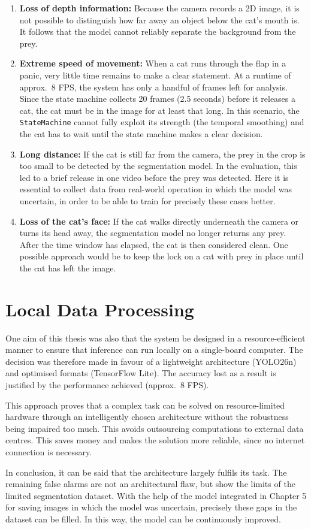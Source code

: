 \begin{enumerate}
    \item \textbf{Loss of depth information:} Because the camera records a 2D image, it is not possible to distinguish how far away an object below the cat's mouth is. It follows that the model cannot reliably separate the background from the prey.
    \item \textbf{Extreme speed of movement:} When a cat runs through the flap in a panic, very little time remains to make a clear statement. At a runtime of approx.\ 8 FPS, the system has only a handful of frames left for analysis. Since the state machine collects 20 frames (2.5 seconds) before it releases a cat, the cat must be in the image for at least that long.  In this scenario, the \texttt{StateMachine} cannot fully exploit its strength (the temporal smoothing) and the cat has to wait until the state machine makes a clear decision.
    \item \textbf{Long distance:} If the cat is still far from the camera, the prey in the crop is too small to be detected by the segmentation model. In the evaluation, this led to a brief release in one video before the prey was detected. Here it is essential to collect data from real-world operation in which the model was uncertain, in order to be able to train for precisely these cases better.
    \item \textbf{Loss of the cat's face:} If the cat walks directly underneath the camera or turns its head away, the segmentation model no longer returns any prey. After the time window has elapsed, the cat is then considered clean. One possible approach would be to keep the lock on a cat with prey in place until the cat has left the image.
\end{enumerate}

\section{Local Data Processing}
One aim of this thesis was also that the system be designed in a resource-efficient manner to ensure that inference can run locally on a single-board computer. The decision was therefore made in favour of a lightweight architecture (YOLO26n) and optimised formats (TensorFlow Lite). The accuracy lost as a result is justified by the performance achieved (approx.\ 8 FPS).

This approach proves that a complex task can be solved on resource-limited hardware through an intelligently chosen architecture without the robustness being impaired too much. This avoids outsourcing computations to external data centres. This saves money and makes the solution more reliable, since no internet connection is necessary.

In conclusion, it can be said that the architecture largely fulfils its task. The remaining false alarms are not an architectural flaw, but show the limits of the limited segmentation dataset. With the help of the model integrated in Chapter 5 for saving images in which the model was uncertain, precisely these gaps in the dataset can be filled. In this way, the model can be continuously improved.
